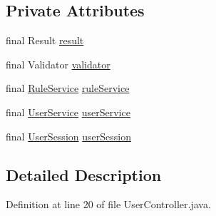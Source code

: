 \subsection*{Private Attributes}
\begin{DoxyCompactItemize}
\item 
final Result \hyperlink{classbr_1_1usp_1_1cata_1_1web_1_1controller_1_1_user_controller_ae158475cfc49f32128036180b3dfc36d}{result}
\item 
final Validator \hyperlink{classbr_1_1usp_1_1cata_1_1web_1_1controller_1_1_user_controller_a230e834923156fb513f39dcd58c8c41b}{validator}
\item 
final \hyperlink{classbr_1_1usp_1_1cata_1_1service_1_1_rule_service}{Rule\+Service} \hyperlink{classbr_1_1usp_1_1cata_1_1web_1_1controller_1_1_user_controller_ab72b00bd805ff0677b29f27f95247eb1}{rule\+Service}
\item 
final \hyperlink{classbr_1_1usp_1_1cata_1_1service_1_1_user_service}{User\+Service} \hyperlink{classbr_1_1usp_1_1cata_1_1web_1_1controller_1_1_user_controller_a315d5cc2b3e9a566e316236c98ca624a}{user\+Service}
\item 
final \hyperlink{classbr_1_1usp_1_1cata_1_1web_1_1controller_1_1_user_session}{User\+Session} \hyperlink{classbr_1_1usp_1_1cata_1_1web_1_1controller_1_1_user_controller_a64ae05ca5e96c92199052ac263d25a00}{user\+Session}
\end{DoxyCompactItemize}


\subsection{Detailed Description}


Definition at line 20 of file User\+Controller.\+java.



